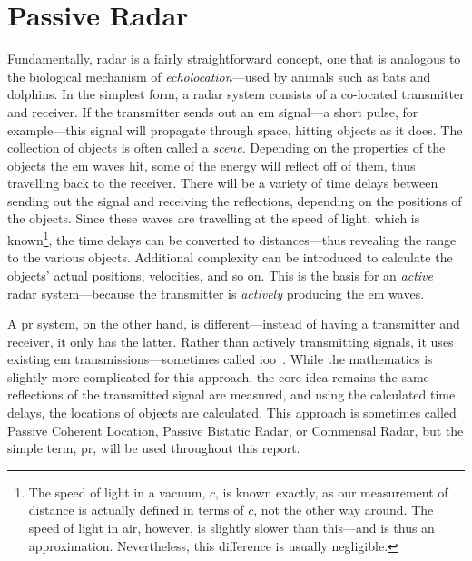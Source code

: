 \documentclass[class=report,11pt,crop=false]{standalone}
\begin{document}
\section{Passive Radar}
Fundamentally, radar is a fairly straightforward concept, one that is analogous to the biological mechanism of \emph{echolocation}---used by animals such as bats and dolphins. In the simplest form, a radar system consists of a co-located transmitter and receiver. If the transmitter sends out an \gls{em} signal---a short pulse, for example---this signal will propagate through space, hitting objects as it does. The collection of objects is often called a \emph{scene}. Depending on the properties of the objects the \gls{em} waves hit, some of the energy will reflect off of them, thus travelling back to the receiver. There will be a variety of time delays between sending out the signal and receiving the reflections, depending on the positions of the objects. Since these waves are travelling at the speed of light, which is known\footnote{The speed of light in a vacuum, \(c\), is known exactly, as our measurement of distance is actually defined in terms of \(c\), not the other way around. The speed of light in air, however, is slightly slower than this---and is thus an approximation. Nevertheless, this difference is usually negligible.}, the time delays can be converted to distances---thus revealing the range to the various objects. Additional complexity can be introduced to calculate the objects' actual positions, velocities, and so on. This is the basis for an \emph{active} radar system---because the transmitter is \emph{actively} producing the \gls{em} waves.

A \gls{pr} system, on the other hand, is different---instead of having a transmitter and receiver, it only has the latter. Rather than actively transmitting signals, it uses existing \gls{em} transmissions---sometimes called \gls{ioo}~\cite{Griffiths1992}. While the mathematics is slightly more complicated for this approach, the core idea remains the same---reflections of the transmitted signal are measured, and using the calculated time delays, the locations of objects are calculated. This approach is sometimes called Passive Coherent Location, Passive Bistatic Radar, or Commensal Radar, but the simple term, \gls{pr}, will be used throughout this report.
\end{document}
